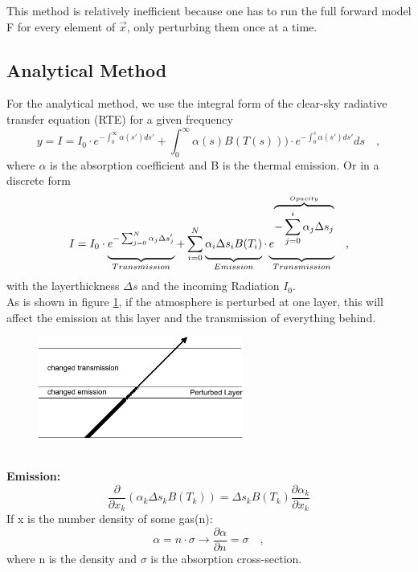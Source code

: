 This method is relatively inefficient because one has to run the full forward
model F for every element of $\vec{x}$, only perturbing them once at a time.

\subsection*{Analytical Method}
For the analytical method, we use the integral form of the clear-sky radiative
transfer equation (RTE) for a given frequency
\begin{equation*}
y=I=I_0 \cdot e^{-\int_0^\infty \alpha(s') ds'}+ \int_0^\infty \alpha(s)B(T(s)))
\cdot e^{-\int_0^s \alpha(s')ds'} ds \quad ,
\end{equation*}
where $\alpha$ is the absorption coefficient and B is the thermal emission. Or
in a discrete form
\begin{equation*}
I=I_0 \cdot \underbrace{\vphantom{\frac{a}{b}}e^{-\sum_{j=0}^N \alpha_j \Delta
		s_j'}}_{\substack{Transmission}}+ \sum_{i=0}^N
\underbrace{\vphantom{\frac{a}{b}}\alpha_i \Delta s_i
	B(T_i)}_{\substack{Emission}} \cdot
\underbrace{\vphantom{\frac{a}{b}}e^{\overbrace{-\sum_{j=0}^i \alpha_j \Delta
			s_j}^{Opacity}}}_{\substack{Transmission}} \quad ,
\end{equation*}
with the layerthickness $\Delta s$ and the incoming Radiation $I_0$.\\

As is shown in figure \ref{fig:perturbedLayer}, if the atmosphere is perturbed
at one layer, this will affect the emission at this layer and the transmission
of everything behind.
\begin{figure}
	\centering
	
	\includegraphics[width=0.6\textwidth]{./figures/perturbedLayer_EmissionTransmission}
	\caption{}
	\label{fig:perturbedLayer}
\end{figure}
\\
\textbf{Emission:}\\
\begin{equation*}
\frac{\partial}{\partial x_k}(\alpha_k \Delta s_k B(T_k)) = \Delta s_k B(T_k)
\frac{\partial \alpha_k}{\partial x_k}
\end{equation*}
If x is the number density of some gas(n):
\begin{equation}
\alpha=n \cdot \sigma \rightarrow \frac{\partial \alpha}{\partial
  n}=\sigma \quad ,
\end{equation}
where n is the density and $\sigma$ is the absorption cross-section.

